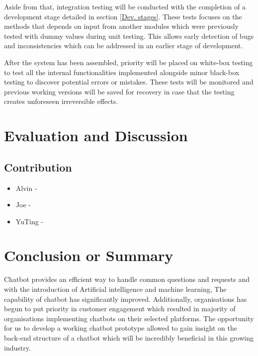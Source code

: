 \documentclass[11pt]{article}
\begin{document}
Aside from that, integration testing will be conducted with the completion of a development stage detailed in section \ref{Dev. stages}. These tests focuses on the methods that depends on input from another modules which were previously tested with dummy values during unit testing. This allows early detection of bugs and inconsistencies which can be addressed in an earlier stage of development.

After the system has been assembled, priority will be placed on white-box testing to test all the internal functionalities implemented alongside minor black-box testing to discover potential errors or mistakes. These tests will be monitored and previous working versions will be saved for recovery in case that the testing creates unforeseen irreversible effects.

\section{Evaluation and Discussion}
\subsection{Contribution}
\begin{itemize}
	\item Alvin  -
	\item Joe    - 
	\item YuTing -
\end{itemize}

\section{Conclusion or Summary}
Chatbot provides an efficient way to handle common questions and requests and with the introduction of Artificial intelligence and machine learning, The capability of chatbot has significantly improved. Additionally, organisations has begun to put priority in customer engagement which resulted in majority of organisations implementing chatbots on their selected platforms. The opportunity for us to develop a working chatbot prototype allowed to gain insight on the back-end structure of a chatbot which will be incredibly beneficial in this growing industry.

\clearpage

%
 
\end{document}
